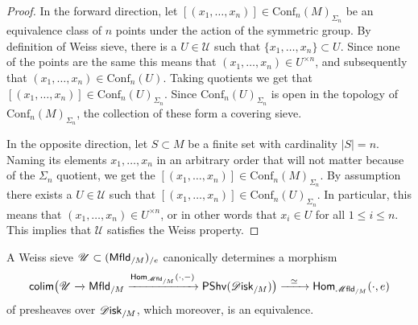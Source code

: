 \documentclass[../text]{subfiles}
\begin{document}
\begin{proof}
    In the forward direction, let $[(x_1, \dots, x_n)] \in \mathrm{Conf}_n(M)_{\Sigma_n}$ be an equivalence class of $n$ points under the action of the symmetric group. By definition of Weiss sieve, there is a $U \in \mathscr{U}$ such that $\{x_1, \dots, x_n\} \subset U$. Since none of the points are the same this means that $(x_1, \dots, x_n) \in U^{\times n}$, and subsequently that $(x_1, \dots, x_n) \in \mathrm{Conf}_n(U)$. Taking quotients we get that $[(x_1, \dots, x_n)] \in \mathrm{Conf}_n(U)_{\Sigma_n}$. Since $\mathrm{Conf}_n(U)_{\Sigma_n}$ is open in the topology of $\mathrm{Conf}_n(M)_{\Sigma_n}$, the collection of these form a covering sieve.

    In the opposite direction, let $S \subset M$ be a finite set with cardinality $|S| = n$. Naming its elements $x_1, \dots, x_n$ in an arbitrary order that will not matter because of the $\Sigma_n$ quotient, we get the $[(x_1, \dots, x_n)] \in \mathrm{Conf}_n(M)_{\Sigma_n}$. By assumption there exists a $U \in \mathscr{U}$ such that $[(x_1, \dots, x_n)] \in \mathrm{Conf}_n(U)_{\Sigma_n}$. In particular, this means that $(x_1, \dots, x_n) \in U^{\times n}$, or in other words that $x_i \in U$ for all $1 \leq i \leq n$. This implies that $\mathscr{U}$ satisfies the Weiss property.
\end{proof}



\begin{lemma}\label{lem:gluing_disk/M/e}
    A Weiss sieve $\mathscr{U} \subset (\mfld[r]_{/M})_{/e}$ canonically determines a morphism
    \begin{equation}
        \mathsf{colim} \big( \mathscr{U} \xrightarrow{} \mfld[r]_{/M} \xrightarrow{\mathsf{Hom}_{\mfld_{/M}}(\cdot, -)} \mathsf{PShv}(\disk_{/M}) \big) \xrightarrow{\ \ \simeq \ \ } \mathsf{Hom}_{\mfld_{/M}}(\cdot, e)
    \end{equation}
    of presheaves over $\disk_{/M}$, which moreover, is an equivalence.
\end{lemma}
\end{document}
